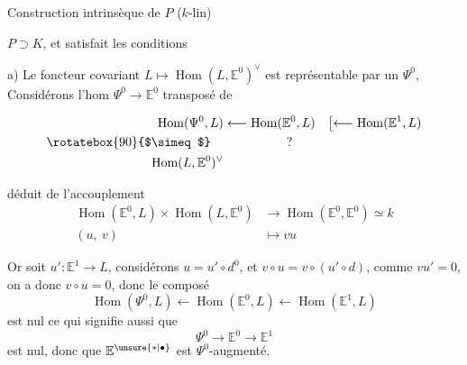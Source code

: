 
Construction intrinsèque de $P$ ($k$-lin)

$P\supset K$, et satisfait les conditions

a) Le foncteur covariant $L\longmapsto\operatorname{Hom}(L,\mathbb E^0)^\vee$ est représentable par un  $\Psi^0$, Considérons l'hom $\Psi^0\longrightarrow\mathbb E^0$ transposé de

\[
\begin{aligned}
\operatorname{Hom}(\Psi^0,L)&\longleftarrow\operatorname{Hom}(\mathbb E^0,L)\quad\bigl[\longleftarrow\operatorname{Hom}(\mathbb E^1,L)\\
\rotatebox{90}{$\simeq$}\quad&\hspace{5em}?\\
\operatorname{Hom}(L,\mathbb E^0)^\vee&
\end{aligned}
\]

déduit de l'accouplement
\[
\begin{aligned}
\operatorname{Hom}(\mathbb E^0,L)\times\operatorname{Hom}(L,\mathbb E^0)&\longrightarrow\operatorname{Hom}(\mathbb E^0,\mathbb E^0)\simeq k\\
(u,\ v)&\longmapsto vu
\end{aligned}
\]


Or soit $u'\colon\mathbb E^1\to L$, considérons $u=u'\circ d^0$, et $v\circ u=v\circ(u'\circ d)$,  comme $vu'=0$, on a donc $v\circ u=0$, donc le composé 
\[
\operatorname{Hom}(\Psi^0,L)\longleftarrow\operatorname{Hom}(\mathbb E^0,L)\longleftarrow\operatorname{Hom}(\mathbb E^1,L)
\]
est nul ce qui signifie aussi que
\[
\Psi^0\longrightarrow\mathbb E^0\longrightarrow\mathbb E^1
\]
est nul, donc que $\mathbb E^{\unsure{*|\bullet}}$ est $\Psi^0$-augmenté.


